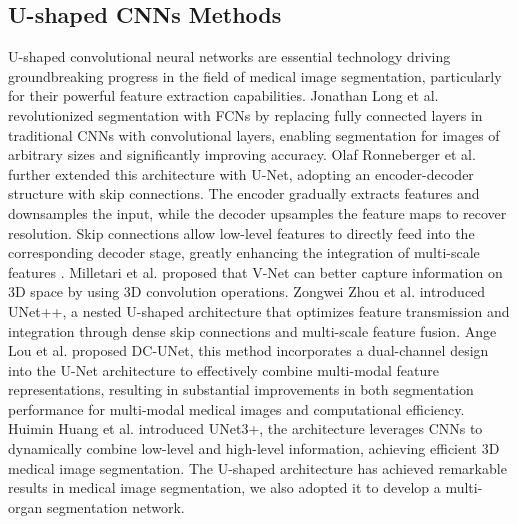 \documentclass[sn-mathphys-num]{sn-jnl}
\theoremstyle{thmstyleone}%
\theoremstyle{thmstyletwo}%
\theoremstyle{thmstylethree}%
\begin{document}
\subsection{U-shaped CNNs Methods}
U-shaped convolutional neural networks are essential technology driving groundbreaking progress in the field of medical image segmentation, particularly for their powerful feature extraction capabilities. 
Jonathan Long et al. \cite{long2015fully} revolutionized segmentation with FCNs by replacing fully connected layers in traditional CNNs with convolutional layers, enabling segmentation for images of arbitrary sizes and significantly improving accuracy.
Olaf Ronneberger et al. \cite{ronneberger2015u} further extended this architecture with U-Net, adopting an encoder-decoder structure with skip connections.
The encoder gradually extracts features and downsamples the input, while the decoder upsamples the feature maps to recover resolution.
Skip connections allow low-level features to directly feed into the corresponding decoder stage, greatly enhancing the integration of multi-scale features \cite{aitken2021understanding}.
Milletari et al. \cite{milletari2016v} proposed that V-Net can better capture information on 3D space by using 3D convolution operations.
Zongwei Zhou et al. \cite{zhou2018unet++} introduced UNet++, a nested U-shaped architecture that optimizes feature transmission and integration through dense skip connections and multi-scale feature fusion.
Ange Lou et al. \cite{lou2021dc} proposed DC-UNet, this method incorporates a dual-channel design into the U-Net architecture to effectively combine multi-modal feature representations, resulting in substantial improvements in both segmentation performance for multi-modal medical images and computational efficiency.
Huimin Huang et al. \cite{huang2020unet} introduced UNet3+, the architecture leverages CNNs to dynamically combine low-level and high-level information, achieving efficient 3D medical image segmentation.
The U-shaped architecture has achieved remarkable results in medical image segmentation, we also adopted it to develop a multi-organ segmentation network.
\end{document}
